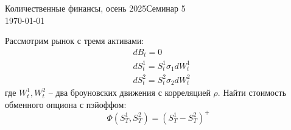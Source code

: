 \documentclass[12pt]{article}
\begin{document}
\noindent Количественные финансы, осень 2025\hfill Семинар 5\\
\today

\hrulefill

\begin{problem}
    Рассмотрим рынок с тремя активами:
    \begin{align*}
        &dB_t = 0\\
        &dS_t^1 = S_t^1 \sigma_1 dW_t^1 \\
        &dS_t^2 = S_t^2 \sigma_2 dW_t^2
    \end{align*}где $W_t^1, W_t^2$ -- два броуновских движения с корреляцией $\rho$. Найти стоимость обменного опциона с пэйоффом:
    $$
        \Phi(S_T^1, S_T^2) = (S_T^1 - S_T^2)^+
    $$
\end{problem}
\end{document}
